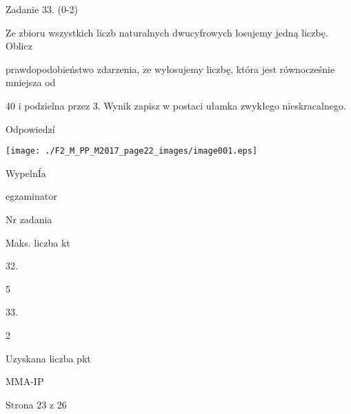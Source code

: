 \documentclass[a4paper,12pt]{article}
\begin{document}
Zadanie 33. (0-2)

Ze zbioru wszystkich liczb naturalnych dwucyfrowych losujemy jedną liczbę. Oblicz

prawdopodobieństwo zdarzenia, $\dot{\mathrm{z}}\mathrm{e}$ wylosujemy liczbę, która jest równocześnie mniejsza od

40 i podzielna przez 3. Wynik zapisz w postaci ułamka zwykłego nieskracalnego.

Odpowiedzí
\begin{center}
\texttt{[image: ./F2\_M\_PP\_M2017\_page22\_images/image001.eps]}
\end{center}
WypelnÍa

egzaminator

Nr zadania

Maks. liczba kt

32.

5

33.

2

Uzyskana liczba pkt

MMA-IP

Strona 23 z 26
\end{document}
